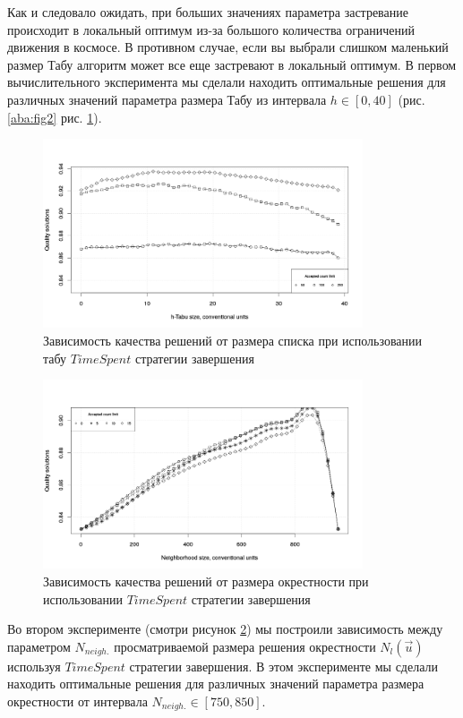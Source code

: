 \documentclass[]{TAACpaper}
\begin{document}
Как и следовало ожидать, при больших значениях параметра застревание происходит в локальный оптимум из-за большого количества ограничений движения в космосе. В противном случае, если вы выбрали слишком маленький размер Табу алгоритм может все еще застревают в локальный оптимум. В первом вычислительного эксперимента мы сделали находить оптимальные решения для различных значений параметра размера Табу из интервала $h \in [0, 40]$ (рис. \ref{aba:fig2} рис. \ref{aba:fig3}).
\begin{figure}[h]
	\hfil\includegraphics[height=2.2in]{images/tabuSize_time}\hfil
	\caption
	{
	Зависимость качества решений от размера списка при использовании табу $ TimeSpent $ стратегии завершения
	}
	\label{aba:fig3}
\end{figure}

\begin{figure}[h]
	\hfil\includegraphics[height=2.2in]{images/acceptedCountLimit}\hfil
	\caption
	{
	 Зависимость качества решений от размера окрестности при использовании $ TimeSpent $ стратегии завершения
	}
	\label{aba:fig4}
\end{figure}

Во втором эксперименте (смотри рисунок  \ref{aba:fig4}) мы построили зависимость между параметром $N_{neigh.}$ просматриваемой размера решения окрестности $N_l(\vec{u})$ используя $TimeSpent$ стратегии завершения. В этом эксперименте мы сделали находить оптимальные решения для различных значений параметра размера окрестности от интервала $N_{neigh.}\in[750, 850]$.
\end{document}
